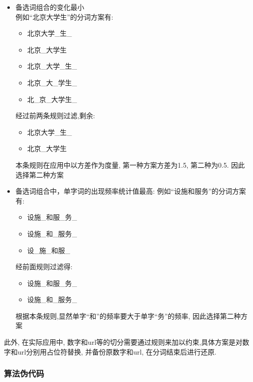 \documentclass[titlepage]{article}
\begin{document}
\begin{itemize}
\item 备选词组合的变化最小\\[1em]
    例如``北京大学生''的分词方案有:
    \begin{itemize}
        \item 北京大学\_生\_
        \item 北京\_大学生
        \item 北京\_大学\_生\_
        \item 北京\_大\_学生\_
        \item 北\_京\_大学生\_
    \end{itemize}
    经过前两条规则过滤,剩余:
    \begin{itemize}
        \item 北京大学\_生\_
        \item 北京\_大学生
    \end{itemize}
    本条规则在应用中以方差作为度量, 第一种方案方差为1.5, 第二种为0.5. 因此选择第二种方案
\item 备选词组合中，单字词的出现频率统计值最高:
    例如``设施和服务''的分词方案有:
    \begin{itemize}
        \item 设施\_和服\_务\_
        \item 设施\_和\_服务\_
        \item 设\_施\_和服\_
    \end{itemize}
    经前面规则过滤得:
    \begin{itemize}
        \item 设施\_和服\_务\_
        \item 设施\_和\_服务\_
    \end{itemize}
    根据本条规则,显然单字``和''的频率要大于单字``务''的频率, 因此选择第二种方案
\end{itemize}

\noindent 此外, 在实际应用中, 数字和url等的切分需要通过规则来加以约束,具体方案是对数字和url分别用占位符替换, 并备份原数字和url, 在分词结束后进行还原.

\newpage
\subsubsection{算法伪代码}
\end{document}
